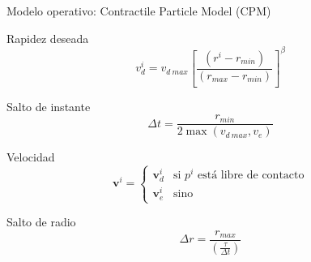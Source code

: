 \begin{frame}{Modelo operativo: Contractile Particle Model (CPM)}
    \begin{center}
        \begin{minipage}[t]{0.45\textwidth}
            \begin{block}{Rapidez deseada}
                \begin{equation*}
                    v_d^i = v_{d\ max} \left[ \frac{(r^i - r_{min})}{(r_{max} - r_{min})} \right]^{\beta}
                \end{equation*}
            \end{block}
        \end{minipage}
        \hfill
        \begin{minipage}[t]{0.45\textwidth}
            \begin{block}{Salto de instante}
                \begin{equation*}
                    \Delta t = \frac{r_{min}}{2 \max (v_{d\ max}, v_e)}
                \end{equation*}
            \end{block}
        \end{minipage}
    \end{center}
    \begin{center}
        \begin{minipage}[t]{0.45\textwidth}
            \begin{block}{Velocidad}
                \begin{equation*}
                    \mathbf{v}^i = \begin{cases}
                                       \mathbf{v}_d^i & \text{si $p^i$ está libre de contacto} \\
                                       \mathbf{v}_e^i & \text{sino}
                    \end{cases}
                \end{equation*}
            \end{block}
        \end{minipage}
        \hfill
        \begin{minipage}[t]{0.45\textwidth}
            \begin{block}{Salto de radio}
                \begin{equation*}
                    \Delta r = \frac{r_{max}}{\left( \frac{\tau}{\Delta t} \right)}
                \end{equation*}
            \end{block}
        \end{minipage}
    \end{center}
\end{frame}

